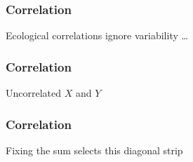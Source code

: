 \documentclass[handout]{beamer}
\begin{document}
   \begin{frame}
   \frametitle{Correlation}
   \begin{center}
   \end{center}
   Ecological correlations ignore variability \dots
   \end{frame}



   \begin{frame}
   \frametitle{Correlation}
   \begin{center}
   \end{center}
   Uncorrelated $X$ and $Y$
   \end{frame}



   \begin{frame}
   \frametitle{Correlation}
   \begin{center}
   \end{center}
   Fixing the sum selects this diagonal strip
   \end{frame}

\end{document}
